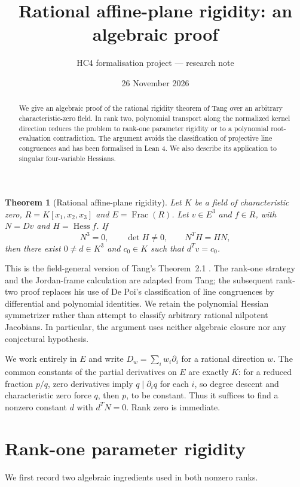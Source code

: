 \documentclass[11pt,a4paper]{article}
\title{Rational affine-plane rigidity: an algebraic proof}
\author{HC4 formalisation project --- research note}
\date{26 November 2026}
\newtheorem{theorem}{Theorem}
\newcommand{\Hess}{\operatorname{Hess}}
\begin{document}
\maketitle
\begin{abstract}
We give an algebraic proof of the rational rigidity theorem of Tang over an arbitrary characteristic-zero field. In rank two, polynomial transport along the normalized kernel direction reduces the problem to rank-one parameter rigidity or to a polynomial root-evaluation contradiction. The argument avoids the classification of projective line congruences and has been formalised in Lean 4. We also describe its application to singular four-variable Hessians.
\end{abstract}

\begin{theorem}[Rational affine-plane rigidity]\label{thm:main}
Let $K$ be a field of characteristic zero, $R=K[x_1,x_2,x_3]$ and $E=\operatorname{Frac}(R)$. Let $v\in E^3$ and $f\in R$, with $N=Dv$ and $H=\Hess f$. If
\begin{equation}\label{eq:nil}
 N^3=0,\qquad \det H\ne0,\qquad N^TH=HN,
\end{equation}
then there exist $0\ne d\in K^3$ and $c_0\in K$ such that $d^Tv=c_0$.
\end{theorem}
This is the field-general version of Tang's Theorem~2.1 \cite{tang}. The rank-one strategy and the Jordan-frame calculation are adapted from Tang; the subsequent rank-two proof replaces his use of De Poi's classification of line congruences \cite{depoi} by differential and polynomial identities. We retain the polynomial Hessian symmetrizer rather than attempt to classify arbitrary rational nilpotent Jacobians. In particular, the argument uses neither algebraic closure nor any conjectural hypothesis.

We work entirely in $E$ and write $D_w=\sum_i w_i\partial_i$ for a rational direction $w$. The common constants of the partial derivatives on $E$ are exactly $K$: for a reduced fraction $p/q$, zero derivatives imply $q\mid\partial_i q$ for each $i$, so degree descent and characteristic zero force $q$, then $p$, to be constant. Thus it suffices to find a nonzero constant $d$ with $d^TN=0$. Rank zero is immediate.

\section{Rank-one parameter rigidity}\label{sec:rankone}
We first record two algebraic ingredients used in both nonzero ranks.
\end{document}
